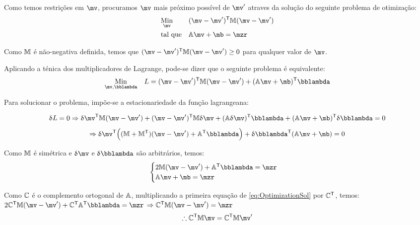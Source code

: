 \documentclass[a4paper,11pt,brazil,fleqn]{article}
\begin{document}
Como temos restri\c{c}\~oes em $\mv$, procuramos $\mv$ mais pr\'oximo poss\'ivel de $\mv'$ atraves da solu\c{c}\~ao do seguinte problema de otimiza\c{c}\~ao:
\begin{equation} \label{eq:Optimization}
\begin{aligned}
& \underset{\mv}{\text{Min}}
& & (\mv - \mv')^\msT \mM (\mv - \mv') \\
& \text{tal que}
& & \mA \mv + \mb = \mzr
\end{aligned}
\end{equation}

Como $\mathbb{M}$ \'e n\~ao-negativa definida, temos que $(\mv - \mv')^\msT \mM (\mv - \mv') \geq 0 $ para qualquer valor de $\mv$.

Aplicando a t\'enica dos multiplicadores de Lagrange, pode-se dizer que o seguinte problema \'e equivalente:
\begin{equation}
\begin{aligned}
& \underset{\mv, \mlambda}{\text{Min}}
& & L = (\mv - \mv')^\msT \mM (\mv - \mv') + (\mA \mv + \mb)^\msT \mlambda \\
\end{aligned}
\end{equation}


Para solucionar o problema, imp\~oe-se a estacionariedade da fun\c{c}\~ao lagrangeana:

$$ \dl L = 0 \Rightarrow \dl \mv^\msT \mM (\mv - \mv') + (\mv - \mv')^\msT \mM \dl \mv + (\mA \dl \mv)^\msT \mlambda + (\mA \mv + \mb)^\msT \dl \mlambda = 0 $$
$$ \Rightarrow \dl \mv^\msT \Big( (\mM + \mM^\msT)(\mv - \mv') + \mA^\msT \mlambda \Big) + \dl \mlambda^\msT (\mA \mv + \mb) = 0 $$

Como $\mathbb{M}$ \'e sim\'etrica e $\dl \mv$ e $\dl \mlambda$ s\~ao arbitr\'arios, temos:
\begin{equation} \label{eq:OptimizationSol}
\begin{cases}
2 \mM (\mv - \mv') + \mA^\msT \mlambda = \mzr \\
\mA \mv + \mb = \mzr
\end{cases}
\end{equation}

Como $\mathbb{C}$ \'e o complemento ortogonal de $\mathbb{A}$, multiplicando a primeira equa\c{c}\~ao de \eqref{eq:OptimizationSol} por $\mathbb{C}^{\mathsf{T}}$, temos: \\

$ 2 \mC^\msT \mM (\mv - \mv') + \mC^\msT \mA^\msT \mlambda = \mzr $
$ \Rightarrow  \mC^\msT \mM (\mv - \mv')  = \mzr $
\begin{equation} \label{eq:OptimizationSol2}
\therefore \mC^\msT \mM \mv  = \mC^\msT \mM  \mv'
\end{equation}
\end{document}
